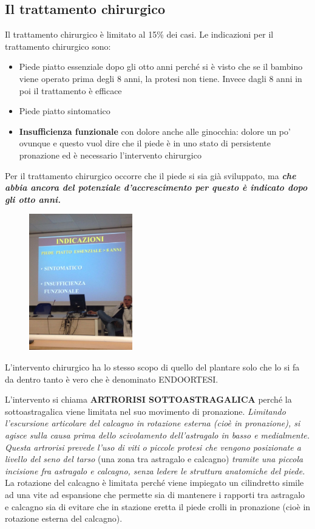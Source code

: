 \subsection{Il trattamento chirurgico}

Il trattamento chirurgico è limitato al 15\% dei casi. Le indicazioni per il trattamento chirurgico sono:

\begin{itemize}
\item
  Piede piatto essenziale dopo gli otto anni perché si è visto che se il bambino viene operato prima degli 8 anni, la protesi non tiene. Invece dagli 8 anni in poi il trattamento è efficace
\item
  Piede piatto sintomatico
\item
  \textbf{Insufficienza funzionale} con dolore anche alle ginocchia: dolore un po' ovunque e questo vuol dire che il piede è in uno stato di persistente pronazione ed è necessario l'intervento chirurgico
\end{itemize}

Per il trattamento chirurgico occorre che il piede si sia già sviluppato, ma \textbf{\emph{che abbia ancora del potenziale d'accrescimento per questo è indicato dopo gli otto anni.}}

\begin{figure}[!ht]
\centering
\includegraphics[width=0.4\textwidth]{015/image6.jpeg}
\end{figure}

L'intervento chirurgico ha lo stesso scopo di quello del plantare solo che lo si fa da dentro tanto è vero che è denominato ENDOORTESI.

L'intervento si chiama \textbf{ARTRORISI SOTTOASTRAGALICA} perché la sottoastragalica viene limitata nel suo movimento di pronazione. \emph{Limitando l'escursione articolare del calcagno in rotazione esterna (cioè in pronazione), si agisce sulla causa prima dello scivolamento dell'astragalo in basso e medialmente.} \emph{Questa artrorisi prevede l'uso di viti o piccole protesi che vengono posizionate a livello del seno del tarso} (una zona tra astragalo e calcagno) \emph{tramite una piccola incisione fra astragalo e calcagno, senza ledere le struttura anatomiche del piede.} La rotazione del calcagno è limitata perché viene impiegato un cilindretto simile ad una vite ad espansione che permette sia di mantenere i rapporti tra astragalo e calcagno sia di evitare che in stazione eretta il piede crolli in pronazione (cioè in rotazione esterna del calcagno).

